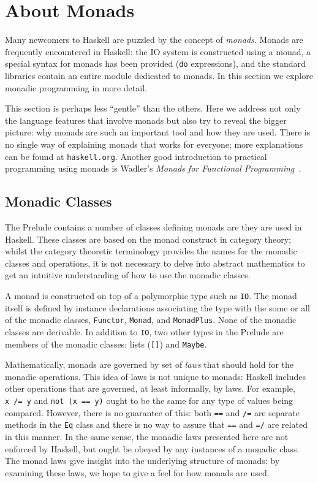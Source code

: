

\section{About Monads}
\label{tut-monads}
Many newcomers to Haskell are puzzled by the concept of {\em monads}.
Monads are frequently encountered in Haskell: the IO system is constructed
using a monad, a special syntax for monads has been provided (\mbox{\tt do}
expressions), and the standard libraries contain an entire module dedicated
to monads.  In this section we explore monadic programming in more detail.

This section is perhaps less ``gentle'' than the others.  Here we
address not only the language features that involve monads but also
try to reveal the bigger picture: why monads are such an important
tool and how they are used.  There is no
single way of explaining monads that works for everyone; more
explanations can be found at {\tt haskell.org}.  Another good
introduction to practical programming using monads is Wadler's 
{\em Monads for Functional Programming}~\cite{wadler:mffp}.  

\subsection{Monadic Classes}
\label{tut-monadic-classes}
The Prelude contains a number of classes defining monads are they
are used in Haskell.  These classes are based on the monad construct
in category theory; whilst the category theoretic terminology
provides the names for the monadic classes and operations, it is not
necessary to delve into abstract mathematics to get an intuitive
understanding of how to use the monadic classes.

A monad is constructed on top of a polymorphic type such as \mbox{\tt IO}.  The
monad itself is defined by instance declarations 
associating the type with the some or all of the
monadic classes, \mbox{\tt Functor}, \mbox{\tt Monad},
and \mbox{\tt MonadPlus}.  None of the monadic classes are derivable.  In addition
to \mbox{\tt IO}, two other types in the Prelude are members of the monadic
classes: lists (\mbox{\tt []}) and \mbox{\tt Maybe}.  

Mathematically, monads are governed by set of {\em laws} that should hold
for the monadic operations.  This idea of laws is not unique to
monads: Haskell includes other operations that are 
governed, at least informally, by laws.  For example, \mbox{\tt x\ /=\ y} and
\mbox{\tt not\ (x\ ==\ y)} ought to be the same for any type of values being
compared.  However, there is no guarantee of this: both \mbox{\tt ==} and \mbox{\tt /=} are 
separate methods in the \mbox{\tt Eq} class and there is no way to assure that
\mbox{\tt ==} and \mbox{\tt =/} are related in this manner.
In the same sense, the monadic laws presented here are not enforced by
Haskell, but ought be obeyed by any instances of a monadic class.
The monad laws give insight into the underlying structure of monads:
by examining these laws, we hope to give a feel for how monads are
used. 

